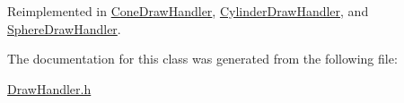 Reimplemented in \mbox{\hyperlink{class_cone_draw_handler_a6cd768c6036dd1ba79f577f9907fd819}{Cone\+Draw\+Handler}}, \mbox{\hyperlink{class_cylinder_draw_handler_ac2ca330f3084182da1bd3db358bb996d}{Cylinder\+Draw\+Handler}}, and \mbox{\hyperlink{class_sphere_draw_handler_a2e94208cf2d1a86d5c5158d9bb9adf9e}{Sphere\+Draw\+Handler}}.



The documentation for this class was generated from the following file\+:\begin{DoxyCompactItemize}
\item 
\mbox{\hyperlink{_draw_handler_8h}{Draw\+Handler.\+h}}\end{DoxyCompactItemize}

